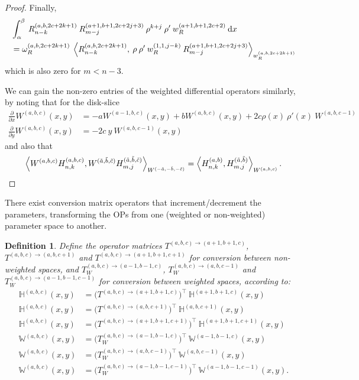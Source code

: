 \documentclass[11pt, oneside]{article}   	%
\newcommand{\pddx}{\frac{\partial}{\partial x}}
\newcommand{\pddy}{\frac{\partial}{\partial y}}
\newcommand{\hdop}{H}
\newcommand{\bighdop}{\mathbb{\hdop}}
\newcommand{\hdopnkab}{\hdop_{n,k}^{(a,b)}}
\newcommand{\hdopmj}{\hdop_{m,j}}
\newcommand{\genjac}{R}
\newcommand{\genjacnmk}{\genjac_{n-k}}
\newcommand{\genjacmmj}{\genjac_{m-j}}
\newcommand{\genjacw}{w_\genjac}
\newcommand{\normgenjac}{\omega_\genjac}
\newcommand{\bigW}{\mathbb{W}}
\newcommand{\hdopnkabc}{\hdop_{n,k}^{(a,b,c)}}
\newcommand{\Wabc}{{W^{(a,b,c)}}}
\newtheorem{definition}{Definition}
\begin{document}
\begin{proof}
Finally,
\begin{align*}
	&\int_\alpha^\beta \: \genjacnmk^{(a, b, 2c+2k+1)} \: \genjacmmj^{(a+1, b+1, 2c+2j+3)} \: \rho^{k+j} \: \rho' \: \genjacw^{(a+1, b+1, 2c+2)} \: \D x \\
	&= \normgenjac^{(a, b, 2c+2k+1)} \: \ip< \genjacnmk^{(a, b, 2c+2k+1)}, \: \rho \: \rho' \: \genjacw^{(1, 1, j-k)} \: \genjacmmj^{(a+1, b+1, 2c+2j+3)} >_{\genjacw^{(a, b, 2c+2k+1)}}
\end{align*}
which is also zero for $m < n - 3$.

We can gain the non-zero entries of the weighted differential operators similarly, by noting that for the disk-slice
\begin{align}
	\pddx \Wabc(x,y) &= -a W^{(a-1, b, c)}(x,y) + bW^{(a, b, c)}(x,y) + 2c \rho(x) \: \rho'(x) \: W^{(a, b, c-1)} \label{eqn:weightderivativex} \\
	\pddy \Wabc(x,y) &= -2c \: y \: W^{(a, b, c-1)}(x,y) \label{eqn:weightderivativey}
\end{align}
and also that
\begin{align*}
	\ip< \Wabc \hdopnkabc, W^{(\tilde{a},\tilde{b},\tilde{c})} \hdopmj^{(\tilde{a},\tilde{b},\tilde{c})} >_{W^{(-\tilde{a},-\tilde{b},-\tilde{c})}} = \ip< \hdopnkab, \hdopmj^{(\tilde{a},\tilde{b})} >_\Wabc.
\end{align*}

\end{proof}

There exist conversion matrix operators that increment/decrement the parameters, transforming the OPs from one (weighted or non-weighted) parameter space to another. 

\begin{definition}\label{def:parametertransformationoperators}
Define the operator matrices $T^{(a,b,c)\to(a+1,b+1,c)}$, $T^{(a,b,c)\to(a,b,c+1)}$ and $T^{(a,b,c)\to(a+1,b+1,c+1)}$ for conversion between non-weighted spaces, and $T_W^{(a,b,c)\to(a-1,b-1,c)}$, $T_W^{(a,b,c)\to(a,b,c-1)}$ and $T_W^{(a,b,c)\to(a-1,b-1,c-1)}$ for conversion between weighted spaces, according to:
\begin{align*}
	\bighdop^{(a,b,c)}(x,y) &= \Big(T^{(a,b,c)\to(a+1,b+1,c)} \Big)^\top \: \bighdop^{(a+1,b+1,c)}(x,y) \\
	\bighdop^{(a,b,c)}(x,y) &= \Big(T^{(a,b,c)\to(a,b,c+1)} \Big)^\top \: \bighdop^{(a,b,c+1)}(x,y) \\
	\bighdop^{(a,b,c)}(x,y) &= \Big(T^{(a,b,c)\to(a+1,b+1,c+1)} \Big)^\top \: \bighdop^{(a+1,b+1,c+1)}(x,y) \\
	\bigW^{(a,b,c)}(x,y) &= \Big(T_W^{(a,b,c)\to(a-1,b-1,c)} \Big)^\top \: \bigW^{(a-1,b-1,c)}(x,y) \\
	\bigW^{(a,b,c)}(x,y) &= \Big(T_W^{(a,b,c)\to(a,b,c-1)} \Big)^\top \: \bigW^{(a,b,c-1)}(x,y) \\
	\bigW^{(a,b,c)}(x,y) &= \Big(T_W^{(a,b,c)\to(a-1,b-1,c-1)} \Big)^\top \: \bigW^{(a-1,b-1,c-1)}(x,y).
\end{align*}
\end{definition}
\end{document}
